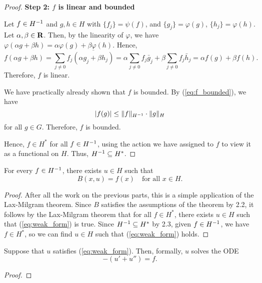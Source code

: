\documentclass{homework}
\begin{document}
\begin{arabicparts}
\begin{proof}
			\textbf{Step 2: $f$ is linear and bounded}
			
			Let $f \in {H^{-1}}$ and $g,h \in H$ with $\{f_j\} = \psi(f)$, and $\{g_j\} = \varphi(g)$, $\{h_j\} = \varphi(h)$. Let $\alpha,\beta\in\textnormal{\bf R}$. Then, by the linearity of $\varphi$, we have $\varphi(\alpha g + \beta h) = \alpha\varphi(g) + \beta\varphi(h)$. Hence,
			\begin{equation}
				f(\alpha g + \beta h) = \sum_{j\ne0} f_j\overline{(\alpha g_j + \beta h_j)} = \alpha\sum_{j\ne0}f_j\bar{g}_j + \beta\sum_{j\ne0}f_j\bar{h}_j = \alpha f(g) + \beta f(h).
			\end{equation}
			Therefore, $f$ is linear.
			
			We have practically already shown that $f$ is bounded. By (\ref{eq:f_bounded}), we have
			\begin{equation}
				|f(g)| \le \lVert f\rVert_{H^{-1}}\cdot\lVert g\rVert_H
			\end{equation}
			for all $g \in G$. Therefore, $f$ is bounded.
			
			Hence, $f \in H^*$ for all $f \in {H^{-1}}$, using the action we have assigned to $f$ to view it as a functional on $H$. Thus, ${H^{-1}} \subseteq H^*$.
		\end{proof}
		
		\questionpart
		For every $f \in {H^{-1}}$, there exists $u \in H$ such that
		\begin{equation}
			\label{eq:weak_form}
			B(x,u) = f(x) \quad\text{for all } x\in H.
		\end{equation}
		
		\begin{proof}
			After all the work on the previous parts, this is a simple application of the Lax-Milgram theorem. Since $B$ satisfies the assumptions of the theorem by 2.2, it follows by the Lax-Milgram theorem that for all $f \in H^*$, there exists $u \in H$ such that (\ref{eq:weak_form}) is true. Since ${H^{-1}} \subseteq H^*$ by 2.3, given $f \in {H^{-1}}$, we have $f \in H^*$, so we can find $u\in H$ such that (\ref{eq:weak_form}) holds.
		\end{proof}
		
		\questionpart
		Suppose that $u$ satisfies (\ref{eq:weak_form}). Then, formally, $u$ solves the ODE
		\begin{equation}
			-(u' + u'')= f.
		\end{equation}
		\begin{proof}
			

\end{proof}
\end{arabicparts}
\end{document}
